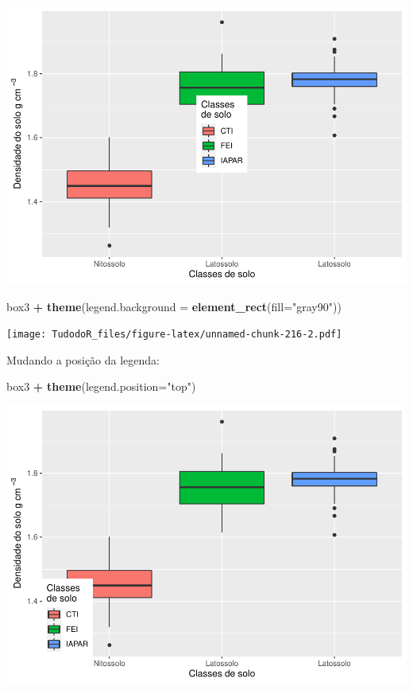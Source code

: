 \documentclass[
]{book}
\newenvironment{Shaded}{\begin{snugshade}}{\end{snugshade}}
\newcommand{\DataTypeTok}[1]{\textcolor[rgb]{0.13,0.29,0.53}{#1}}
\newcommand{\KeywordTok}[1]{\textcolor[rgb]{0.13,0.29,0.53}{\textbf{#1}}}
\newcommand{\NormalTok}[1]{#1}
\newcommand{\OperatorTok}[1]{\textcolor[rgb]{0.81,0.36,0.00}{\textbf{#1}}}
\newcommand{\StringTok}[1]{\textcolor[rgb]{0.31,0.60,0.02}{#1}}
\begin{document}
\includegraphics{TudodoR_files/figure-latex/unnamed-chunk-216-1.pdf}

\begin{Shaded}
\begin{Highlighting}[]
\NormalTok{box3 }\OperatorTok{+}\StringTok{ }\KeywordTok{theme}\NormalTok{(}\DataTypeTok{legend.background =} \KeywordTok{element_rect}\NormalTok{(}\DataTypeTok{fill=}\StringTok{"gray90"}\NormalTok{))}
\end{Highlighting}
\end{Shaded}

\texttt{[image: TudodoR\_files/figure-latex/unnamed-chunk-216-2.pdf]}

Mudando a posição da legenda:

\begin{Shaded}
\begin{Highlighting}[]
\NormalTok{box3 }\OperatorTok{+}\StringTok{ }\KeywordTok{theme}\NormalTok{(}\DataTypeTok{legend.position=}\StringTok{"top"}\NormalTok{)}
\end{Highlighting}
\end{Shaded}

\includegraphics{TudodoR_files/figure-latex/unnamed-chunk-217-1.pdf}
\end{document}
